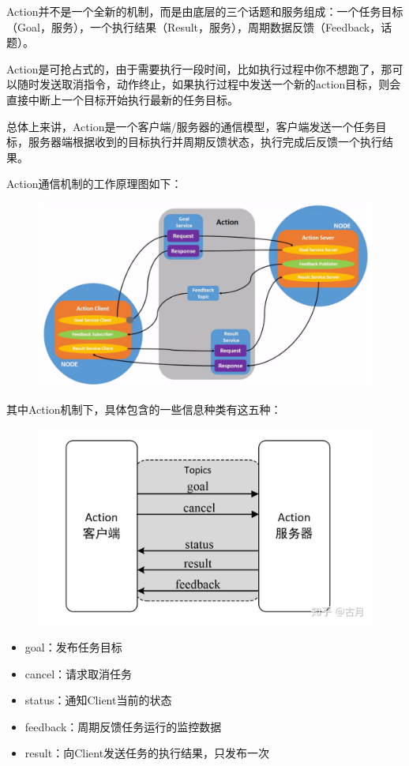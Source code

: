 \documentclass[9pt, oneside]{book}
\begin{document}
Action并不是一个全新的机制，而是由底层的三个话题和服务组成：一个任务目标（Goal，服务），一个执行结果（Result，服务），周期数据反馈（Feedback，话题）。

Action是可抢占式的，由于需要执行一段时间，比如执行过程中你不想跑了，那可以随时发送取消指令，动作终止，如果执行过程中发送一个新的action目标，则会直接中断上一个目标开始执行最新的任务目标。

总体上来讲，Action是一个客户端/服务器的通信模型，客户端发送一个任务目标，服务器端根据收到的目标执行并周期反馈状态，执行完成后反馈一个执行结果。

Action通信机制的工作原理图如下：

\begin{figure}[H]
    \centering
    \includegraphics[width=0.9\linewidth]{image/Action.png}
\end{figure}

其中Action机制下，具体包含的一些信息种类有这五种：

\begin{figure}[H]
    \centering
    \includegraphics[width=0.5\linewidth]{image/Action_topic.jpg}
\end{figure}

\begin{itemize}
    \item goal：发布任务目标
    \item cancel：请求取消任务
    \item status：通知Client当前的状态
    \item feedback：周期反馈任务运行的监控数据
    \item result：向Client发送任务的执行结果，只发布一次
\end{itemize}
\end{document}
